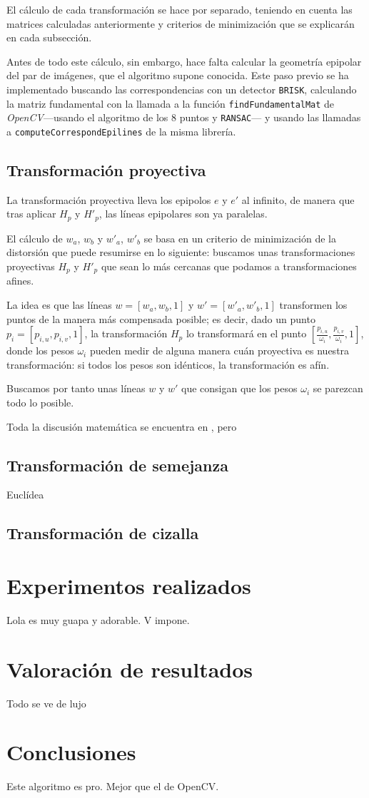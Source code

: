 \documentclass[a4paper, 11pt]{article}
\theoremstyle{definition}
\begin{document}
    El cálculo de cada transformación se hace por separado, teniendo en cuenta las matrices calculadas anteriormente y criterios de minimización que se explicarán en cada subsección.

    Antes de todo este cálculo, sin embargo, hace falta calcular la geometría epipolar del par de imágenes, que el algoritmo supone conocida. Este paso previo se ha implementado buscando las correspondencias con un detector \lstinline{BRISK}, calculando la matriz fundamental con la llamada a la función \lstinline{findFundamentalMat} de \emph{OpenCV}---usando el algoritmo de los 8 puntos y \lstinline{RANSAC}--- y usando las llamadas a \lstinline{computeCorrespondEpilines} de la misma librería.

    \subsection{Transformación proyectiva}
    La transformación proyectiva lleva los epipolos $e$ y $e'$ al infinito, de manera que tras aplicar $H_p$ y $H'_p$, las líneas epipolares son ya paralelas.

    El cálculo de $w_a$, $w_b$ y  $w'_a$, $w'_b$ se basa en un criterio de minimización de la distorsión que puede resumirse en lo siguiente: buscamos unas transformaciones proyectivas $H_p$ y $H'_p$ que sean lo más cercanas que podamos a transformaciones afines.

    La idea es que las líneas $w = [w_a, w_b, 1]$ y $w' = [w'_a, w'_b, 1]$ transformen los puntos de la manera más compensada posible; es decir, dado un punto $p_i = [p_{i,u}, p_{i,v}, 1]$, la transformación $H_p$ lo transformará en el punto $[\frac{p_{i,u}}{\omega_i}, \frac{p_{i,v}}{\omega_i}, 1]$, donde los pesos $\omega_i$ pueden medir de alguna manera cuán proyectiva es nuestra transformación: si todos los pesos son idénticos, la transformación es afín.

    Buscamos por tanto unas líneas $w$ y $w'$ que consigan que los pesos $\omega_i$ se parezcan todo lo posible.

    Toda la discusión matemática se encuentra en \cite{LoopZhang}, pero

    \subsection{Transformación de semejanza}
    Euclídea

    \subsection{Transformación de cizalla}

    \section{Experimentos realizados}

    Lola es muy guapa y adorable. V impone.

    \section{Valoración de resultados}

    Todo se ve de lujo

    \section{Conclusiones}

    Este algoritmo es pro. Mejor que el de OpenCV.
\end{document}
